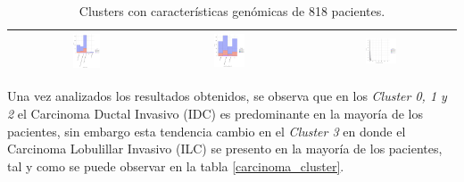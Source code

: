 \begin{table}
\begin{center}
\begin{tabular}{ |c|c|c|c| }
			& \includegraphics[width=0.22\textwidth]{NOTEBOOK/IMAGENES_BIRCH_DESCRIPTIVAS/38} 
			& \includegraphics[width=0.22\textwidth]{NOTEBOOK/IMAGENES_BIRCH_DESCRIPTIVAS/39} 
			& \includegraphics[width=0.22\textwidth]{NOTEBOOK/IMAGENES_BIRCH_DESCRIPTIVAS/40} 
			\\  \hline                  
		\end{tabular} 
			\caption{Clusters con características genómicas de 818 pacientes.}
			\label{clusters}
	\end{center} 
\end{table}
\break
Una vez analizados los resultados obtenidos, se observa que en los \textit {Cluster 0, 1 y 2} el Carcinoma  Ductal Invasivo (IDC) es predominante en la mayoría de los pacientes, sin embargo esta tendencia cambio en el \textit{Cluster 3} en donde el Carcinoma Lobulillar Invasivo (ILC) se presento en la mayoría de los pacientes, tal y como se puede observar en la tabla \ref{carcinoma_cluster}. 
